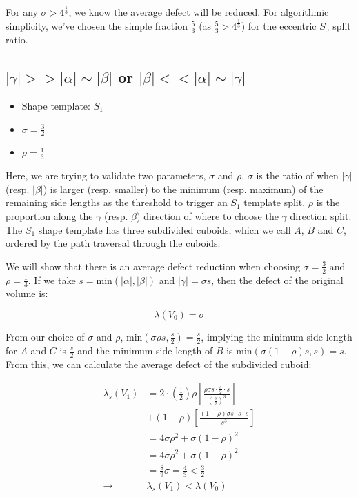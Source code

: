 For any $\sigma > 4^{\frac{1}{3}}$, we know the average defect will be reduced.
For algorithmic simplicity, we've chosen the simple fraction $\frac{5}{3}$ (as $\frac{5}{3} > 4^{\frac{1}{3}}$)
for the eccentric $S_0$ split ratio.


\subsection{$|\gamma| >> |\alpha| \sim |\beta|$ or $|\beta| << |\alpha| \sim |\gamma|$}

\begin{itemize}
  \item Shape template: $S_1$
  \item $\sigma = \frac{3}{2}$
  \item $\rho = \frac{1}{3}$
\end{itemize}

Here, we are trying to validate two parameters, $\sigma$ and $\rho$.
$\sigma$ is the ratio of when $|\gamma|$ (resp. $|\beta|$)
is larger (resp. smaller) to the minimum (resp. maximum) of the remaining side lengths as the threshold to trigger an $S_1$
template split.
$\rho$ is the proportion along the $\gamma$ (resp. $\beta$) direction of where to choose the $\gamma$ direction split.
The $S_1$ shape template has three subdivided cuboids, which we call $A$, $B$ and $C$, ordered by
the path traversal through the cuboids.

We will show that there is an average defect reduction when choosing $\sigma = \frac{3}{2}$ and
$\rho = \frac{1}{3}$.
If we take $s = \text{min}(|\alpha|, |\beta|)$ and $|\gamma| = \sigma s$, then the defect of the original volume is:

$$
\lambda(V_0) = \sigma
$$

From our choice of $\sigma$ and $\rho$, $\text{min}( \sigma \rho s, \frac{s}{2} ) = \frac{s}{2}$,
implying the minimum side length for $A$ and $C$ is $\frac{s}{2}$ and the minimum side length of $B$
is $\text{min}( \sigma (1-\rho) s, s) = s$.
From this, we can calculate the average defect of the subdivided cuboid:

$$
\begin{array}{ll}
  \lambda_s (V_1) & = 2 \cdot (\frac{1}{2}) \rho [ \frac{ \rho \sigma s \cdot \frac{s}{2} \cdot s }{ (\frac{s}{2})^3 } ] \\
        & + (1-\rho) [ \frac{ (1-\rho) \sigma s \cdot s \cdot s }{s^3} ] \\
   & = 4 \sigma \rho^2 + \sigma (1-\rho)^2 \\
  & = 4 \sigma \rho^2 + \sigma (1-\rho)^2 \\
  & = \frac{8}{9} \sigma = \frac{4}{3} < \frac{3}{2} \\
  \to & \lambda_s(V_1) < \lambda(V_0)
\end{array}
$$

